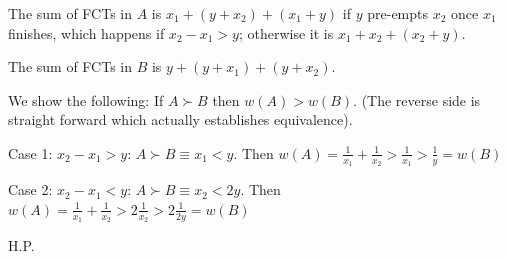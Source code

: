 \documentclass[12pt]{article}
\begin{document}
The sum of FCTs in $A$ is $x_1 + (y + x_2) + (x_1 + y)$ if $y$ pre-empts $x_2$ once $x_1$ finishes, which happens if $x_2 - x_1 > y$; otherwise it is $x_1 + x_2 + (x_2 + y)$.

The sum of FCTs in $B$ is $y + (y + x_1) + (y + x_2)$.

We show the following:
If $A \succ B$ then $w(A) > w(B)$. (The reverse side is straight forward which actually establishes equivalence).

Case 1: $x_2 - x_1 > y$:
$A \succ B \equiv x_1 < y$. Then $w(A) = \frac{1}{x_1} + \frac{1}{x_2} > \frac{1}{x_1} > \frac{1}{y} = w(B)$

Case 2: $x_2 - x_1 < y$:
$A \succ B \equiv x_2 < 2y$. Then $w(A) = \frac{1}{x_1} + \frac{1}{x_2} > 2\frac{1}{x_2} > 2\frac{1}{2y} = w(B)$

H.P.
\end{document}
